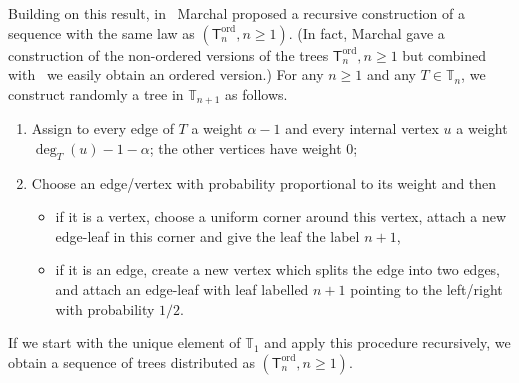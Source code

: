 \documentclass[10pt]{amsart}
\theoremstyle{definition}\newtheorem{defi}[theo]{Definition}\newtheorem{rema}[theo]{Remark}\newtheorem{exam}[theo]{Example}\newtheorem{exem}[theo]{Example}\newtheorem{nota}[theo]{Notation}
\newcommand{\ord}{\mathrm{ord}}
\newcommand{\sT}{\mathsf{T}}
\newcommand{\A}{\mathbb{T}}
\begin{document}
Building on this result, in~\cite{Marchal} Marchal proposed a recursive construction of a sequence with the same law as $(\sT^{\ord}_n,n \geq 1)$. (In fact, Marchal gave a construction of the non-ordered versions of the trees $\sT^{\ord}_n,n \geq 1$ but combined with~\cite[Section~2.3]{Marchal} we easily obtain an ordered version.) For any $n \geq 1$ and any $T\in\A_n$, we construct randomly a tree in $\A_{n+1}$ as follows.
\begin{enumerate}
\item Assign to every edge of $T$ a weight $\alpha-1$ and every internal vertex $u$ a weight $\deg_T(u)-1-\alpha$; the other vertices have weight 0;
\item Choose an edge/vertex with probability proportional to its weight and then
\begin{itemize}
\item if it is a vertex, choose a uniform corner around this vertex, attach a new edge-leaf in this corner and give the leaf the label $n+1$,
\item if it is an edge, create a new vertex which splits the edge into two edges, and attach an edge-leaf with leaf labelled $n+1$ pointing to the left/right with probability $1/2$.
\end{itemize}
\end{enumerate}
If we start with the unique element of $\A_1$ and apply this procedure recursively, we obtain a sequence of trees distributed as $(\sT^{\ord}_n,n \geq 1)$.
\end{document}
